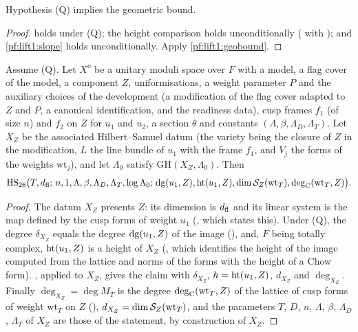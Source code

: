 \begin{corollary}\label{pf:lift1:geobound-cor}
Hypothesis (Q) implies the geometric bound.
\end{corollary}

\begin{proof}
 holds under (Q); the height comparison holds unconditionally
( with ); and
\cref{pf:lift1:slope} holds unconditionally. Apply \cref{pf:lift1:geobound}.
\end{proof}

\begin{theorem}\label{pf:lift1:hscomp}
Assume (Q). Let $X^o$ be a unitary moduli space over $F$ with a model, a flag cover of the model, a
component $Z$, uniformisations, a weight parameter $P$ and the auxiliary choices of the development (a
modification of the flag cover adapted to $Z$ and $P$, a canonical identification, and the readiness
data), cusp frames $f_1$ (of size $n$) and $f_2$ on $Z$ for $u_1$ and $u_2$, a section $\theta$ and
constants $(\Lambda,\beta,\Lambda_D,\Lambda_T)$. Let $X_Z$ be the associated Hilbert--Samuel datum
(the variety being the closure of $Z$ in the modification, $L$ the line bundle of $u_1$ with the frame
$f_1$, and $V_j$ the forms of the weights $\mathrm{wt}_j$), and let $\Lambda_0$ satisfy
$\mathrm{GH}(X_Z,\Lambda_0)$. Then
\[
\mathrm{HS}_{26}\bigl(T,d_{\mathrm{fl}};\,n,1,\Lambda,\beta,\Lambda_D,\Lambda_T,\log\Lambda_0;\,
\mathrm{dg}(u_1,Z),\mathrm{ht}(u_1,Z),\dim\mathcal S_Z(\mathrm{wt}_T),\mathrm{deg}_{\mathrm{C}}(\mathrm{wt}_T,Z)\bigr).
\]
\end{theorem}

\begin{proof}
The datum $X_Z$ presents $Z$: its dimension is $d_{\mathrm{fl}}$ and its linear system is the map defined by
the cusp forms of weight $u_1$ (, which states this). Under
(Q), the degree $\delta_{X_Z}$ equals the degree $\mathrm{dg}(u_1,Z)$ of the image
(), and, $F$ being totally complex,
$\mathrm{ht}(u_1,Z)$ is a height of $X_Z$ (,
which identifies the height of the image computed from the lattice and norms of the forms with the height
of a Chow form). , applied to $X_Z$, gives the claim with $\delta_{X_Z}$, $h=\mathrm{ht}(u_1,Z)$,
$d_{X_Z}$ and $\deg_{X_Z}$. Finally $\deg_{X_Z}=\deg M_T$ is the degree $\mathrm{deg}_{\mathrm{C}}(\mathrm{wt}_T,Z)$ of the
lattice of cusp forms of weight $\mathrm{wt}_T$ on $Z$ (),
$d_{X_Z}=\dim\mathcal S_Z(\mathrm{wt}_T)$, and the parameters $T$, $D$, $n$, $\Lambda$, $\beta$,
$\Lambda_D$, $\Lambda_T$ of $X_Z$ are those of the statement, by construction of $X_Z$.
\end{proof}


